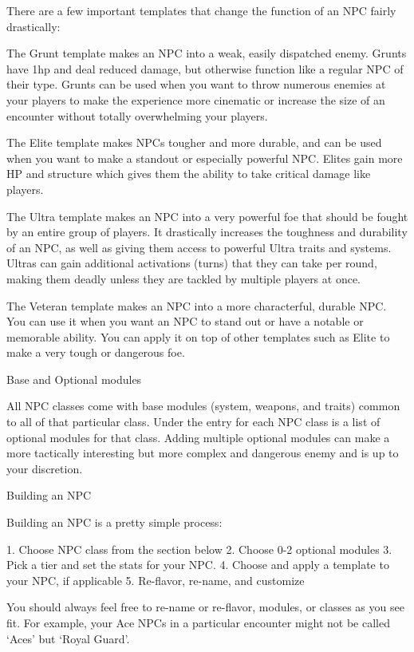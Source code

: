 There are a few important templates that change the function of an NPC fairly drastically:
 

The Grunt template makes an NPC into a weak, easily dispatched enemy. Grunts have 1hp and  
deal reduced damage, but otherwise function like a regular NPC of their type. Grunts can be  
used when you want to throw numerous enemies at your players to make the experience more  
cinematic or increase the size of an encounter without totally overwhelming your players.
 

The Elite template makes NPCs tougher and more durable, and can be used when you want to  
make a standout or especially powerful NPC. Elites gain more HP and structure which gives  
them the ability to take critical damage like players.
 

The Ultra template makes an NPC into a very powerful foe that should be fought by an entire  
group of players. It drastically increases the toughness and durability of an NPC, as well as  
giving them access to powerful Ultra traits and systems. Ultras can gain additional activations  
(turns) that they can take per round, making them deadly unless they are tackled by multiple  
players at once.
 

The Veteran template makes an NPC into a more characterful, durable NPC. You can use it  
when you want an NPC to stand out or have a notable or memorable ability. You can apply it on  
top of other templates such as Elite to make a very tough or dangerous foe.
 

                                      Base and Optional modules  

All NPC classes come with base modules (system, weapons, and traits) common to all of that  
particular class. Under the entry for each NPC class is a list of optional modules for that class.  
Adding multiple optional modules can make a more tactically interesting but more complex and  
dangerous enemy and is up to your discretion.
 

                                             Building an NPC  

Building an NPC is a pretty simple process:
 

    1.  Choose NPC class from the section below  
    2.  Choose 0-2 optional modules  
    3.  Pick a tier and set the stats for your NPC.  
    4.  Choose and apply a template to your NPC, if applicable  
    5.  Re-flavor, re-name, and customize  

You should always feel free to re-name or re-flavor, modules, or classes as you see fit. For  
example, your Ace NPCs in a particular encounter might not be called ‘Aces’ but ‘Royal Guard’.
 

